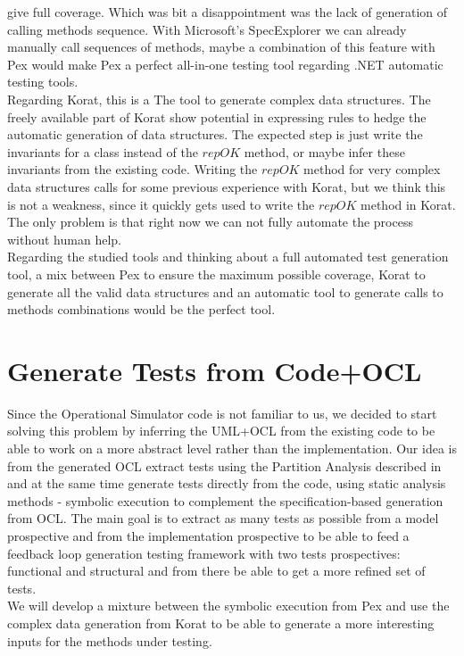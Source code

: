 \documentclass[10pt, conference, compsocconf]{IEEEtran}
\begin{document}
give full coverage. Which was bit a disappointment was the lack of generation of calling methods sequence. With Microsoft's SpecExplorer we can already
manually call sequences of methods, maybe a combination of this feature with Pex would make Pex a perfect all-in-one testing tool regarding .NET automatic testing tools.\\
Regarding Korat, this is a The tool to generate complex data structures. The freely available part of Korat show potential in expressing rules to hedge
the automatic generation of data structures. The expected step is just write the invariants for a class instead of the $repOK$ method, or maybe infer these invariants 
from the existing code. Writing the $repOK$ method for very complex data structures calls for some previous experience with Korat, but we think
this is not a weakness, since it quickly gets used to write the $repOK$ method in Korat. The only problem is that right now we can not fully automate the process
without human help.\\

Regarding the studied tools and thinking about a full automated test generation tool, a mix between Pex to ensure the maximum possible coverage, 
Korat to generate all the valid data structures and an automatic tool to generate calls to methods combinations would be the perfect tool.

\section{Generate Tests from Code+OCL}
Since the Operational Simulator code is not familiar to us, we decided to start solving this problem by inferring the UML+OCL from the existing code
to be able to work on a more abstract level rather than the implementation. Our idea is from the generated OCL extract tests using the Partition Analysis described
in \cite{Benattou02generatingtest} and at the same time generate tests directly from the code, using static analysis methods - symbolic execution to complement
the specification-based generation from OCL. The main goal is to extract as many tests as possible from a model prospective and from the implementation prospective
to be able to feed a feedback loop\cite{Xie03mutuallyenhancing} generation testing framework with two tests prospectives: functional and structural and from there
be able to get a more refined set of tests.\\
We will develop a mixture between the symbolic execution from Pex and use the complex data generation from Korat to be able to generate a more interesting inputs for
the methods under testing.
\end{document}
